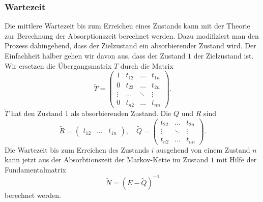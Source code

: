 \subsubsection{Wartezeit}
%
Die mittlere Wartezeit bis zum Erreichen eines Zustands kann mit der
Theorie zur Berechnung der Absorptionszeit berechnet werden.
Dazu modifiziert man den Prozess dahingehend, dass der Zielzustand
ein absorbierender Zustand wird.
Der Einfachheit halber gehen wir davon aus, dass der Zustand $1$ 
der Zielzustand ist.
Wir ersetzen die Übergangsmatrix $T$ durch die Matrix
\[
\tilde{T}
=
\left(
\begin{array}{c|ccc}
1     &t_{12}&\dots &t_{1n}\\
\hline
0     &t_{22}&\dots &t_{2n}\\
\vdots&\dots &\ddots&\vdots\\
0     &t_{n2}&\dots &t_{nn}
\end{array}\right).
\]
$\tilde{T}$ hat den Zustand $1$ als absorbierenden Zustand.
Die $Q$ und $R$ sind
\[
\tilde{R}
=
\begin{pmatrix}t_{12}&\dots&t_{1n}\end{pmatrix},
\quad
\tilde{Q}
=
\begin{pmatrix}
t_{22}&\dots &t_{2n}\\
\vdots&\ddots&\vdots\\
t_{n2}&\dots &t_{nn}
\end{pmatrix}.
\]
Die Wartezeit bis zum Erreichen des Zustands $i$ ausgehend von einem
Zustand $n$ kann jetzt aus der Absorbtionszeit der Markov-Kette
im Zustand $1$ mit Hilfe der Fundamentalmatrix
\[
\tilde{N} 
=
(E-\tilde{Q})^{-1}
\]
berechnet werden.


